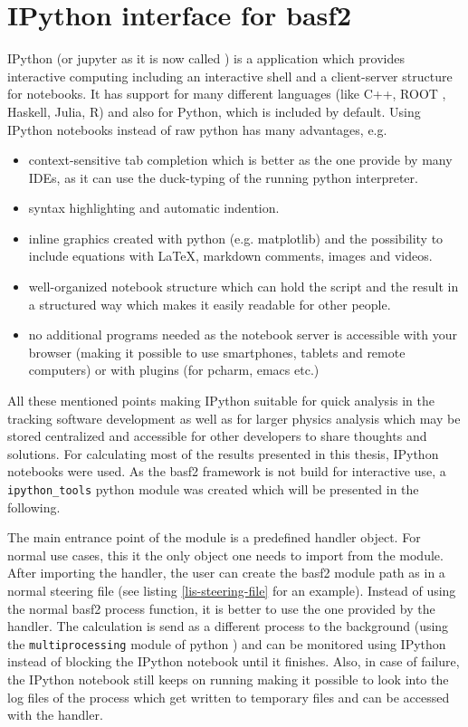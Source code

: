 \section{IPython interface for basf2}

IPython (or jupyter as it is now called \cite{jupyter}) is a application which provides interactive computing including an interactive shell and a client-server structure for notebooks. It has support for many different languages (like C++, ROOT \cite{root-ipython}, Haskell, Julia, R) and also for Python, which is included by default. Using IPython notebooks instead of raw python has many advantages, e.g.
\begin{itemize}
  \item context-sensitive tab completion which is better as the one provide by many IDEs, as it can use the duck-typing of the running python interpreter.
  \item syntax highlighting and automatic indention.
  \item inline graphics created with python (e.g. matplotlib) and the possibility to include equations with \LaTeX, markdown comments, images and videos.
  \item well-organized notebook structure which can hold the script and the result in a structured way which makes it easily readable for other people.
  \item no additional programs needed as the notebook server is accessible with your browser (making it possible to use smartphones, tablets and remote computers) or with plugins (for pcharm, emacs etc.)
\end{itemize}

All these mentioned points making IPython suitable for quick analysis in the tracking software development as well as for larger physics analysis which may be stored centralized and accessible for other developers to share thoughts and solutions. For calculating most of the results presented in this thesis, IPython notebooks were used. As the basf2 framework is not build for interactive use, a \texttt{ipython\_tools} python module was created which will be presented in the following.

The main entrance point of the module is a predefined handler object. For normal use cases, this it the only object one needs to import from the module. After importing the handler, the user can create the basf2 module path as in a normal steering file (see listing \ref{lis-steering-file} for an example). Instead of using the normal basf2 process function, it is better to use the one provided by the handler. The calculation is send as a different process to the background (using the \texttt{multiprocessing} module of python \cite{multiprocessing}) and can be monitored using IPython instead of blocking the IPython notebook until it finishes. Also, in case of failure, the IPython notebook still keeps on running making it possible to look into the log files of the process which get written to temporary files and can be accessed with the handler.

